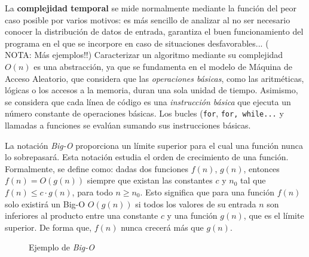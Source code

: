 \documentclass[titlepage]{article}
\begin{document}
La \textbf{complejidad temporal} se mide normalmente mediante la función del peor caso posible por varios motivos: es más sencillo de analizar al no ser necesario conocer la distribución de datos de entrada, garantiza el buen funcionamiento del programa en el que se incorpore en caso de situaciones desfavorables... (\\NOTA: Más ejemplos!!) Caracterizar un algoritmo mediante su complejidad \(O(n)\) es una abstracción, ya que se fundamenta en el modelo de Máquina de Acceso Aleatorio, que considera que las \textit{operaciones básicas}, como las aritméticas, lógicas o los accesos a la memoria, duran una sola unidad de tiempo. Asimismo, se considera que cada línea de código es una \textit{instrucción básica} que ejecuta un número constante de operaciones básicas. Los bucles (\lstinline{for}, \lstinline{for, while...} y llamadas a funciones se evalúan sumando sus instrucciones básicas.

La notación \textit{Big-O} proporciona un límite superior para el cual una función nunca lo sobrepasará. Esta notación estudia el orden de crecimiento de una función. Formalmente, se define como: dadas dos funciones \(f(n)\), \(g(n)\), entonces \(f(n) = O(g(n))\) siempre que existan las constantes \(c\) y \(n_0\) tal que \(f(n) \leq c\cdot g(n)\), para todo \(n \geq n_0\). Esto significa que para una función \(f(n)\) solo existirá un Big-O \(O(g(n))\) si todos los valores de su entrada \(n\) son inferiores al producto entre una constante \(c\) y una función \(g(n)\), que es el límite superior. De forma que, \(f(n)\) nunca crecerá más que \(g(n)\).

\begin{figure}
\captionsetup{justification=centering}
\centering    
    
    \caption{Ejemplo de \textit{Big-O}}
    \label{fig:bigO}
    
\end{figure}
\end{document}
